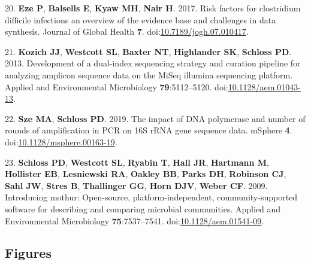 \documentclass[11pt,]{article}
\begin{document}
\hypertarget{ref-Eze2017}{}
20. \textbf{Eze P}, \textbf{Balsells E}, \textbf{Kyaw MH}, \textbf{Nair
H}. 2017. Risk factors for clostridium difficile infections an overview
of the evidence base and challenges in data synthesis. Journal of Global
Health \textbf{7}.
doi:\href{https://doi.org/10.7189/jogh.07.010417}{10.7189/jogh.07.010417}.

\hypertarget{ref-Kozich2013}{}
21. \textbf{Kozich JJ}, \textbf{Westcott SL}, \textbf{Baxter NT},
\textbf{Highlander SK}, \textbf{Schloss PD}. 2013. Development of a
dual-index sequencing strategy and curation pipeline for analyzing
amplicon sequence data on the MiSeq illumina sequencing platform.
Applied and Environmental Microbiology \textbf{79}:5112--5120.
doi:\href{https://doi.org/10.1128/aem.01043-13}{10.1128/aem.01043-13}.

\hypertarget{ref-Sze2019}{}
22. \textbf{Sze MA}, \textbf{Schloss PD}. 2019. The impact of DNA
polymerase and number of rounds of amplification in PCR on 16S rRNA gene
sequence data. mSphere \textbf{4}.
doi:\href{https://doi.org/10.1128/msphere.00163-19}{10.1128/msphere.00163-19}.

\hypertarget{ref-Schloss2009}{}
23. \textbf{Schloss PD}, \textbf{Westcott SL}, \textbf{Ryabin T},
\textbf{Hall JR}, \textbf{Hartmann M}, \textbf{Hollister EB},
\textbf{Lesniewski RA}, \textbf{Oakley BB}, \textbf{Parks DH},
\textbf{Robinson CJ}, \textbf{Sahl JW}, \textbf{Stres B},
\textbf{Thallinger GG}, \textbf{Horn DJV}, \textbf{Weber CF}. 2009.
Introducing mothur: Open-source, platform-independent,
community-supported software for describing and comparing microbial
communities. Applied and Environmental Microbiology
\textbf{75}:7537--7541.
doi:\href{https://doi.org/10.1128/aem.01541-09}{10.1128/aem.01541-09}.

\newpage

\subsection{Figures}\label{figures}
\end{document}
